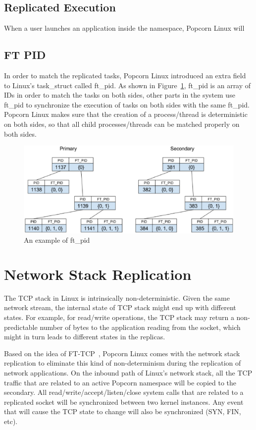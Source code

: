 \subsection{Replicated Execution}
When a user launches an application inside the namespace, Popcorn Linux will

\subsection{FT PID}
In order to match the replicated tasks, Popcorn Linux introduced an extra field to Linux's task\_struct called ft\_pid. As shown in Figure~\ref{f:ft_pid}, ft\_pid is an array of IDs in order to match the tasks on both sides, other parts in the system use ft\_pid to synchronize the execution of tasks on both sides with the same ft\_pid. Popcorn Linux makes sure that the creation of a process/thread is deterministic on both sides, so that all child processes/threads can be matched properly on both sides.
\begin{figure}[!ht]
\centering
\includegraphics[width=.9575\columnwidth]{figures/ft_pid}
 \caption{An example of ft\_pid}
 \label{f:ft_pid}
\end{figure}

\section{Network Stack Replication}
The TCP stack in Linux is intrinsically non-deterministic. Given the same network stream, the internal state of TCP stack might end up with different states. For example, for read/write operations, the TCP stack may return a non-predictable number of bytes to the application reading from the socket, which might in turn leads to different states in the replicas.

Based on the idea of FT-TCP~\cite{zagorodnov2003engineering}, Popcorn Linux comes with the network stack replication to eliminate this kind of non-determinism during the replication of network applications. On the inbound path of Linux's network stack, all the TCP traffic that are related to an active Popcorn namespace will be copied to the secondary. All read/write/accept/listen/close system calls that are related to a replicated socket will be synchronized between two kernel instances. Any event that will cause the TCP state to change will also be synchronized (SYN, FIN, etc).

